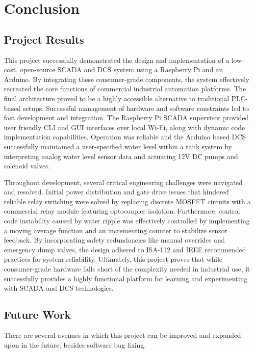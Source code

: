 \documentclass[../main.tex]{subfiles}
\begin{document}
\section{Conclusion}
\label{sec:conc}

\subsection{Project Results}
This project successfully demonstrated the design and implementation of a low-cost, open-source SCADA and DCS system using a Raspberry Pi and an Arduino. By integrating these consumer-grade components, the system effectively recreated the core functions of commercial industrial automation platforms. The final architecture proved to be a highly accessible alternative to traditional PLC-based setups. Successful management of hardware and software constraints led to fast development and integration. The Raspberry Pi SCADA supervisor provided user friendly CLI and GUI interfaces over local Wi-Fi, along with dynamic code implementation capabilities. Operation was reliable and the Arduino based DCS successfully maintained a user-specified water level within a tank system by interpreting analog water level sensor data and actuating 12V DC pumps and solenoid valves.

Throughout development, several critical engineering challenges were navigated and resolved. Initial power distribution and gate drive issues that hindered reliable relay switching were solved by replacing discrete MOSFET circuits with a commercial relay module featuring optocoupler isolation. Furthermore, control code instability caused by water ripple was effectively controlled by implementing a moving average function and an incrementing counter to stabilize sensor feedback. By incorporating safety redundancies like manual overrides and emergency dump valves, the design adhered to ISA-112 and IEEE recommended practices for system reliability. Ultimately, this project proves that while consumer-grade hardware falls short of the complexity needed in industrial use, it successfully provides a highly functional platform for learning and experimenting with SCADA and DCS technologies.

\subsection{Future Work}
There are several avenues in which this project can be improved and expanded upon in the future, besides software bug fixing.
\end{document}

